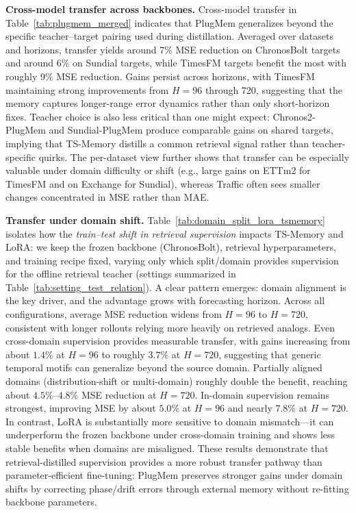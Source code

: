 \noindent\textbf{Cross-model transfer across backbones.}
Cross-model transfer in Table~\ref{tab:plugmem_merged} indicates that PlugMem generalizes beyond the specific teacher--target pairing used during distillation. Averaged over datasets and horizons, transfer yields around 7\% MSE reduction on ChronosBolt targets and around 6\% on Sundial targets, while TimesFM targets benefit the most with roughly 9\% MSE reduction. Gains persist across horizons, with TimesFM maintaining strong improvements from $H=96$ through 720, suggesting that the memory captures longer-range error dynamics rather than only short-horizon fixes. Teacher choice is also less critical than one might expect: Chronos2-PlugMem and Sundial-PlugMem produce comparable gains on shared targets, implying that TS-Memory distills a common retrieval signal rather than teacher-specific quirks. The per-dataset view further shows that transfer can be especially valuable under domain difficulty or shift (e.g., large gains on ETTm2 for TimesFM and on Exchange for Sundial), whereas Traffic often sees smaller changes concentrated in MSE rather than MAE.



\noindent\textbf{Transfer under domain shift.}
Table~\ref{tab:domain_split_lora_tsmemory} isolates how the \emph{train–test shift in retrieval supervision} impacts TS-Memory and LoRA: we keep the frozen backbone (ChronosBolt), retrieval hyperparameters, and training recipe fixed, varying only which split/domain provides supervision for the offline retrieval teacher (settings summarized in Table~\ref{tab:setting_test_relation}). A clear pattern emerges: domain alignment is the key driver, and the advantage grows with forecasting horizon. Across all configurations, average MSE reduction widens from $H{=}96$ to $H{=}720$, consistent with longer rollouts relying more heavily on retrieved analogs. Even cross-domain supervision provides measurable transfer, with gains increasing from about $1.4\%$ at $H{=}96$ to roughly $3.7\%$ at $H{=}720$, suggesting that generic temporal motifs can generalize beyond the source domain. Partially aligned domains (distribution-shift or multi-domain) roughly double the benefit, reaching about $4.5\%$--$4.8\%$ MSE reduction at $H{=}720$. In-domain supervision remains strongest, improving MSE by about $5.0\%$ at $H{=}96$ and nearly $7.8\%$ at $H{=}720$. In contrast, LoRA is substantially more sensitive to domain mismatch—it can underperform the frozen backbone under cross-domain training and shows less stable benefits when domains are misaligned. These results demonstrate that retrieval-distilled supervision provides a more robust transfer pathway than parameter-efficient fine-tuning: PlugMem preserves stronger gains under domain shifts by correcting phase/drift errors through external memory without re-fitting backbone parameters.






